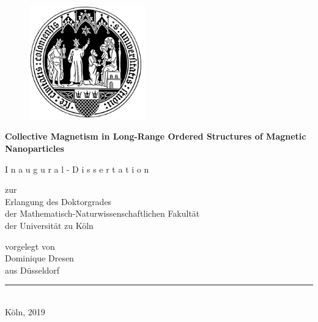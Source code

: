 \documentclass[12pt,
  paper=a4,
  a4paper,
 ]{scrbook}
\begin{document}
  \begin{center}
    \begin{figure}[H]
      \centering
      \includegraphics[width=5cm]{Universitaet_zu_Koeln-Siegel}
    \end{figure}
    \LARGE\textbf{Collective Magnetism in Long-Range Ordered Structures of Magnetic Nanoparticles}

    \vspace{2cm}

    \Large{I n a u g u r a l - D i s s e r t a t i o n } \\

    \vspace{2cm}

    \large{zur}\\
    \large{Erlangung des Doktorgrades}\\
    \large{der Mathematisch-Naturwissenschaftlichen Fakult\"at}\\
    \large der Universit\"at zu K\"oln\\

    \vspace{2cm}

    \large{vorgelegt von}\\
    \large{Dominique Dresen}\\
    \large{aus D\"usseldorf}\\

    \vspace{2cm}

    \noindent\rule{14cm}{0.4pt}\\
    \normalsize{Köln, 2019}\\
  \end{center}
\end{document}
